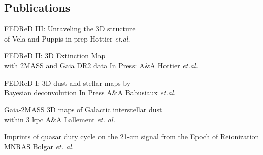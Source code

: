 \documentclass[
 a4paper, 9.5pt,
  sidebarwidth=0.3\paperwidth,
]{fortysecondscv}
\begin{document}
\makefrontsidebar

\begin{cvtable}
\end{cvtable}


\begin{cvtable}
\end{cvtable}

\subsection{Publications}
\begin{cvtable}
  {FEDReD III: Unraveling the 3D structure \\of Vela and Puppis}
  {in prep}
  {Hottier \textit{et.al.}}

  {FEDReD II: 3D Extinction Map\\ with 2MASS and Gaia DR2 data}
  {\href{https://ui.adsabs.harvard.edu/abs/2020arXiv200703734H/abstract}{In Press: A\&A}}
  {Hottier \textit{et.al.}}

  {FEDReD I: 3D dust and stellar maps by \\Bayesian deconvolution}
  {\href{https://ui.adsabs.harvard.edu/abs/2020arXiv200704455B/abstract}{In Press A\&A}}
  {Babusiaux \textit{et.al.}}

  {Gaia-2MASS 3D maps of Galactic interstellar dust\\within 3 kpc}
  {\href{https://ui.adsabs.harvard.edu/\#abs/2019arXiv190204116L/abstract}{A\&A}}
  {Lallement \textit{et. al.}}

  {Imprints of quasar duty cycle on the 21-cm signal from the Epoch of Reionization}
  {\href{https://ui.adsabs.harvard.edu/\#abs/2019arXiv190204116L/abstract}{MNRAS}}
  {Bolgar \textit{et. al.}}
\end{cvtable}
\end{document}
